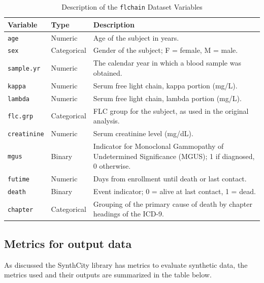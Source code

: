 \begin{table}[H]
    \centering
    \caption{Description of the \texttt{flchain} Dataset Variables}
    \begin{tabular}{|l|l|p{9cm}|}
    \hline
    \textbf{Variable} & \textbf{Type} & \textbf{Description} \\ \hline
    \texttt{age} & Numeric & Age of the subject in years. \\ \hline
    \texttt{sex} & Categorical & Gender of the subject; F = female, M = male. \\ \hline
    \texttt{sample.yr} & Numeric & The calendar year in which a blood sample was obtained. \\ \hline
    \texttt{kappa} & Numeric & Serum free light chain, kappa portion (mg/L). \\ \hline
    \texttt{lambda} & Numeric & Serum free light chain, lambda portion (mg/L). \\ \hline
    \texttt{flc.grp} & Categorical & FLC group for the subject, as used in the original analysis. \\ \hline
    \texttt{creatinine} & Numeric & Serum creatinine level (mg/dL). \\ \hline
    \texttt{mgus} & Binary & Indicator for Monoclonal Gammopathy of Undetermined Significance (MGUS); 1 if diagnosed, 0 otherwise. \\ \hline
    \texttt{futime} & Numeric & Days from enrollment until death or last contact. \\ \hline
    \texttt{death} & Binary & Event indicator; 0 = alive at last contact, 1 = dead. \\ \hline
    \texttt{chapter} & Categorical & Grouping of the primary cause of death by chapter headings of the ICD-9. \\ \hline
    \end{tabular}
    \label{tab:flchain_variables}
\end{table}  


\subsection{Metrics for output data}
As discussed the SynthCity \parencite{qian_synthcity_2023} library has metrics to evaluate synthetic data, the metrics used and their outputs are summarized in the table below. 

